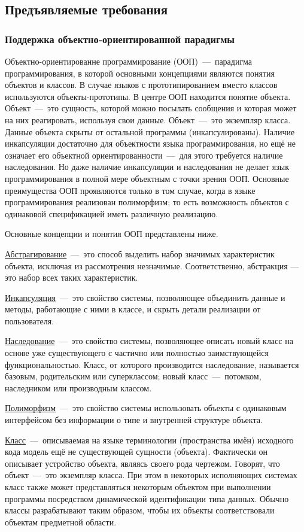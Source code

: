 ﻿\subsection{Предъявляемые требования}
\subsubsection{Поддержка объектно-ориентированной парадигмы}
Объектно-ориентированне программирование (ООП)~---~парадигма программирования, в которой основными концепциями являются понятия объектов и классов. В случае языков с прототипированием вместо классов используются объекты-прототипы. В центре ООП находится понятие объекта. Объект~---~это сущность, которой можно посылать сообщения и которая может на них реагировать, используя свои данные. Объект~---~это экземпляр класса. Данные объекта скрыты от остальной программы (инкапсулированы).
Наличие инкапсуляции достаточно для объектности языка программирования, но ещё не означает его объектной ориентированности~---~для этого требуется наличие наследования.
Но даже наличие инкапсуляции и наследования не делает язык программирования в полной мере объектным с точки зрения ООП. Основные преимущества ООП проявляются только в том случае, когда в языке программирования реализован полиморфизм; то есть возможность объектов с одинаковой спецификацией иметь различную реализацию.

Основные концепции и понятия ООП представлены ниже.

\uline{Абстрагирование}~---~это способ выделить набор значимых характеристик объекта, исключая из рассмотрения незначимые. Соответственно, абстракция — это набор всех таких характеристик.

\uline{Инкапсуляция}~---~это свойство системы, позволяющее объединить данные и методы, работающие с ними в классе, и скрыть детали реализации от пользователя.

\uline{Наследование}~---~это свойство системы, позволяющее описать новый класс на основе уже существующего с частично или полностью заимствующейся функциональностью. Класс, от которого производится наследование, называется базовым, родительским или суперклассом; новый класс~---~потомком, наследником или производным классом.

\uline{Полиморфизм}~---~это свойство системы использовать объекты с одинаковым интерфейсом без информации о типе и внутренней структуре объекта.

\uline{Класс}~---~описываемая на языке терминологии (пространства имён) исходного кода модель ещё не существующей сущности (объекта). Фактически он описывает устройство объекта, являясь своего рода чертежом. Говорят, что объект~---~это экземпляр класса. При этом в некоторых исполняющих системах класс также может представляться некоторым объектом при выполнении программы посредством динамической идентификации типа данных. Обычно классы разрабатывают таким образом, чтобы их объекты соответствовали объектам предметной области.

